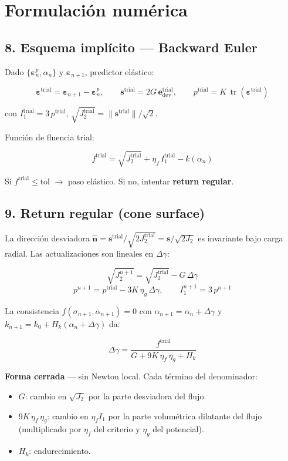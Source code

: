 \documentclass[11pt,letterpaper,oneside]{report}
\begin{document}
\section{Formulación numérica}

\subsection{8. Esquema implícito --- Backward Euler}

Dado $\{\boldsymbol\varepsilon^p_n, \alpha_n\}$ y $\boldsymbol\varepsilon_{n+1}$, predictor elástico:

\[
\boldsymbol\varepsilon^\text{trial} = \boldsymbol\varepsilon_{n+1} - \boldsymbol\varepsilon^p_n, \qquad \mathbf s^\text{trial} = 2G\,\mathbf e^\text{trial}_\text{dev},\qquad p^\text{trial} = K\,\operatorname{tr}(\boldsymbol\varepsilon^\text{trial})
\]

con $I_1^\text{trial} = 3\,p^\text{trial}$, $\sqrt{J_2^\text{trial}} = \|\mathbf s^\text{trial}\|/\sqrt{2}$.

Función de fluencia trial:

\[
f^\text{trial} = \sqrt{J_2^\text{trial}} + \eta_f\,I_1^\text{trial} - k(\alpha_n)
\]

Si $f^\text{trial} \leq \text{tol}$ \ensuremath{\to} paso elástico. Si no, intentar \textbf{return regular}.

\subsection{9. Return regular (cone surface)}

La dirección desviadora $\hat{\mathbf n} = \mathbf s^\text{trial}/\sqrt{2 J_2^\text{trial}} = \mathbf s/\sqrt{2 J_2}$ es invariante bajo carga radial. Las actualizaciones son lineales en $\Delta\gamma$:

\[
\sqrt{J_2^{n+1}} = \sqrt{J_2^\text{trial}} - G\,\Delta\gamma
\]
\[
p^{n+1} = p^\text{trial} - 3K\,\eta_g\,\Delta\gamma, \qquad I_1^{n+1} = 3\,p^{n+1}
\]

La consistencia $f(\sigma_{n+1}, \alpha_{n+1}) = 0$ con $\alpha_{n+1} = \alpha_n + \Delta\gamma$ y $k_{n+1} = k_0 + H_k(\alpha_n + \Delta\gamma)$ da:

\[
\boxed{\;\Delta\gamma = \frac{f^\text{trial}}{G + 9K\,\eta_f\,\eta_g + H_k}\;}
\]

\textbf{Forma cerrada} --- sin Newton local. Cada término del denominador:
\begin{itemize}
  \item $G$: cambio en $\sqrt{J_2}$ por la parte desviadora del flujo.
  \item $9K\,\eta_f\,\eta_g$: cambio en $\eta_f I_1$ por la parte volumétrica dilatante del flujo (multiplicado por $\eta_f$ del criterio y $\eta_g$ del potencial).
  \item $H_k$: endurecimiento.
\end{itemize}
\end{document}
